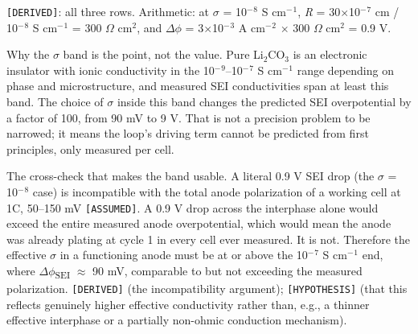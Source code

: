 \documentclass[11pt,a4paper]{article}
\begin{document}
\texttt{[DERIVED]}: all three rows. Arithmetic: at \ensuremath{\sigma} = 10\ensuremath{^{-}}\ensuremath{^{8}} S cm\ensuremath{^{-}}\ensuremath{^{1}}, \emph{R} = 30\ensuremath{\times}10\ensuremath{^{-}}\ensuremath{^{7}} cm / 10\ensuremath{^{-}}\ensuremath{^{8}} S cm\ensuremath{^{-}}\ensuremath{^{1}} = 300 \ensuremath{\Omega} cm\ensuremath{^{2}}, and \ensuremath{\Delta}\ensuremath{\phi} = 3\ensuremath{\times}10\ensuremath{^{-}}\ensuremath{^{3}} A cm\ensuremath{^{-}}\ensuremath{^{2}} \ensuremath{\times} 300 \ensuremath{\Omega} cm\ensuremath{^{2}} = 0.9 V.


Why the \ensuremath{\sigma} band is the point, not the value. Pure Li\ensuremath{_{2}}CO\ensuremath{_{3}} is an electronic insulator with ionic conductivity in the 10\ensuremath{^{-}}\ensuremath{^{9}}--10\ensuremath{^{-}}\ensuremath{^{7}} S cm\ensuremath{^{-}}\ensuremath{^{1}} range depending on phase and microstructure, and measured SEI conductivities span at least this band. The choice of \ensuremath{\sigma} inside this band changes the predicted SEI overpotential by a factor of 100, from 90 mV to 9 V. That is not a precision problem to be narrowed; it means the loop's driving term cannot be predicted from first principles, only measured per cell.


The cross-check that makes the band usable. A literal 0.9 V SEI drop (the \ensuremath{\sigma} = 10\ensuremath{^{-}}\ensuremath{^{8}} case) is incompatible with the total anode polarization of a working cell at 1C, 50--150 mV \texttt{[ASSUMED]}. A 0.9 V drop across the interphase alone would exceed the entire measured anode overpotential, which would mean the anode was already plating at cycle 1 in every cell ever measured. It is not. Therefore the effective \ensuremath{\sigma} in a functioning anode must be at or above the 10\ensuremath{^{-}}\ensuremath{^{7}} S cm\ensuremath{^{-}}\ensuremath{^{1}} end, where \ensuremath{\Delta}\ensuremath{\phi}\textsubscript{SEI} \ensuremath{\approx} 90 mV, comparable to but not exceeding the measured polarization. \texttt{[DERIVED]} (the incompatibility argument); \texttt{[HYPOTHESIS]} (that this reflects genuinely higher effective conductivity rather than, e.g., a thinner effective interphase or a partially non-ohmic conduction mechanism).
\end{document}
